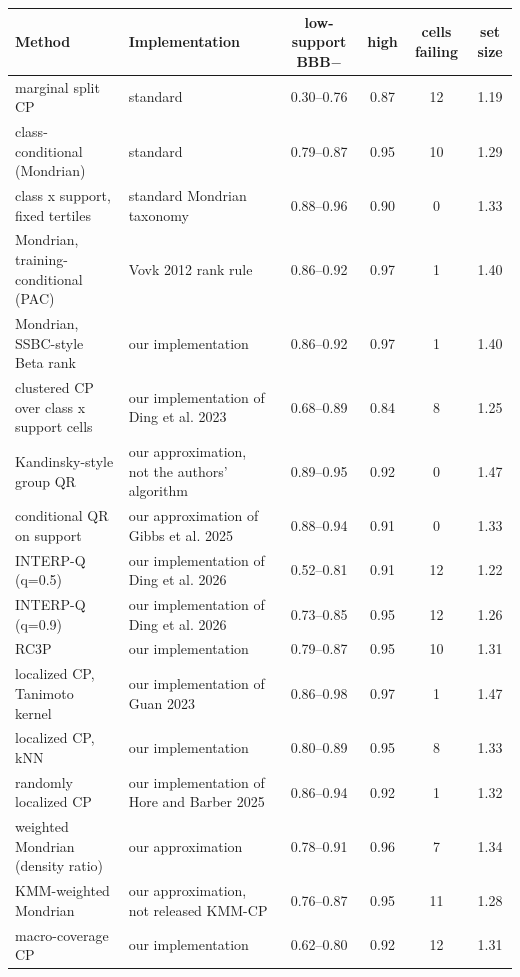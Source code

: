 \begin{tabular}{p{4.4cm}p{3.6cm}cccc}
\toprule
Method & Implementation & low-support BBB$-$ & high & cells failing & set size\\
\midrule
marginal split CP & standard & 0.30--0.76 & 0.87 & 12 & 1.19\\
class-conditional (Mondrian) & standard & 0.79--0.87 & 0.95 & 10 & 1.29\\
class x support, fixed tertiles & standard Mondrian taxonomy & 0.88--0.96 & 0.90 & 0 & 1.33\\
Mondrian, training-conditional (PAC) & Vovk 2012 rank rule & 0.86--0.92 & 0.97 & 1 & 1.40\\
Mondrian, SSBC-style Beta rank & our implementation & 0.86--0.92 & 0.97 & 1 & 1.40\\
clustered CP over class x support cells & our implementation of Ding et al. 2023 & 0.68--0.89 & 0.84 & 8 & 1.25\\
Kandinsky-style group QR & our approximation, not the authors' algorithm & 0.89--0.95 & 0.92 & 0 & 1.47\\
conditional QR on support & our approximation of Gibbs et al. 2025 & 0.88--0.94 & 0.91 & 0 & 1.33\\
INTERP-Q (q=0.5) & our implementation of Ding et al. 2026 & 0.52--0.81 & 0.91 & 12 & 1.22\\
INTERP-Q (q=0.9) & our implementation of Ding et al. 2026 & 0.73--0.85 & 0.95 & 12 & 1.26\\
RC3P & our implementation & 0.79--0.87 & 0.95 & 10 & 1.31\\
localized CP, Tanimoto kernel & our implementation of Guan 2023 & 0.86--0.98 & 0.97 & 1 & 1.47\\
localized CP, kNN & our implementation & 0.80--0.89 & 0.95 & 8 & 1.33\\
randomly localized CP & our implementation of Hore and Barber 2025 & 0.86--0.94 & 0.92 & 1 & 1.32\\
weighted Mondrian (density ratio) & our approximation & 0.78--0.91 & 0.96 & 7 & 1.34\\
KMM-weighted Mondrian & our approximation, not released KMM-CP & 0.76--0.87 & 0.95 & 11 & 1.28\\
macro-coverage CP & our implementation & 0.62--0.80 & 0.92 & 12 & 1.31\\
\bottomrule
\end{tabular}
